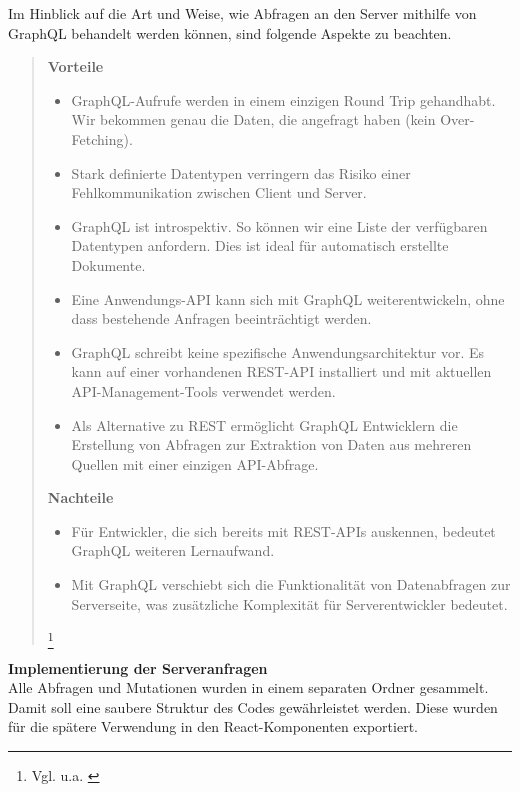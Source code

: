 Im Hinblick auf die Art und Weise, wie Abfragen an den Server mithilfe von 
\\ GraphQL behandelt werden können, sind folgende Aspekte zu beachten.
\\
\begin{quote}
  \textbf{Vorteile}\\

  \begin{itemize}
    \item
          GraphQL-Aufrufe werden in einem einzigen Round Trip gehandhabt. Wir bekommen genau die Daten, die angefragt haben (kein Over-Fetching).

    \item
          Stark definierte Datentypen verringern das Risiko einer Fehlkommunikation zwischen Client und Server.

    \item
          GraphQL ist introspektiv. So können wir eine Liste der verfügbaren Datentypen anfordern. Dies ist ideal für automatisch erstellte Dokumente.

    \item
          Eine Anwendungs-API kann sich mit GraphQL weiterentwickeln, ohne dass bestehende Anfragen beeinträchtigt werden.
    \item
          GraphQL schreibt keine spezifische Anwendungsarchitektur vor. Es kann auf einer vorhandenen REST-API installiert und mit aktuellen API-Management-Tools verwendet werden.
    \item
          Als Alternative zu REST ermöglicht GraphQL Entwicklern die Erstellung von Abfragen zur Extraktion von Daten aus mehreren Quellen mit einer einzigen API-Abfrage.

  \end{itemize}

  \textbf{Nachteile}
  \begin{itemize}
    \item
          Für Entwickler, die sich bereits mit REST-APIs auskennen, bedeutet GraphQL weiteren Lernaufwand.
    \item
          Mit GraphQL verschiebt sich die Funktionalität von Datenabfragen zur Serverseite, was zusätzliche Komplexität für Serverentwickler bedeutet.

  \end{itemize}

  \footnote{Vgl. u.a. \cite{RH1}}
\end{quote}

\textbf{Implementierung der Serveranfragen}\\
Alle Abfragen und Mutationen wurden in einem separaten Ordner gesammelt.
Damit soll eine saubere Struktur des Codes gewährleistet werden.
Diese wurden für die spätere Verwendung in den React-Komponenten exportiert.

